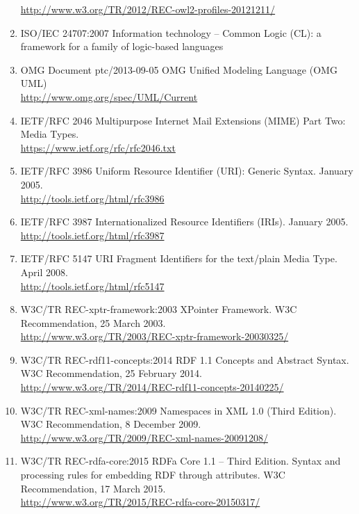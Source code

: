 \documentclass[10pt, a4paper]{isov2}
\begin{document}
\begin{enumerate}[label=\bfseries NR\arabic*]
{  \url{http://www.w3.org/TR/2012/REC-owl2-profiles-20121211/}}\label{nref-OWL2-profiles}
  \item{ISO/IEC 24707:2007} {Information technology – Common Logic (CL): a framework for a family of logic-based languages}\label{nref-CL}
  \item{OMG Document ptc/2013-09-05} {OMG Unified Modeling Language (OMG UML)\\
  \url{http://www.omg.org/spec/UML/Current}}\label{nref-UML} %
  \item{IETF/RFC 2046} {Multipurpose Internet Mail Extensions (MIME)
    Part Two: Media Types.\\ 
    \url{https://www.ietf.org/rfc/rfc2046.txt}}\label{nref-text/plain}
  \item{IETF/RFC 3986} {Uniform Resource Identifier (URI): Generic Syntax. January 2005.\\ \url{http://tools.ietf.org/html/rfc3986}}\label{nref-URI}
  \item{IETF/RFC 3987} {Internationalized Resource Identifiers (IRIs). January 2005.\\ \url{http://tools.ietf.org/html/rfc3987}}\label{nref-IRI}
  \item{IETF/RFC 5147} {URI Fragment Identifiers for the text/plain Media Type.  April 2008.\\ \url{http://tools.ietf.org/html/rfc5147}}\label{nref-text/plain-URI}
  \item{W3C/TR REC-xptr-framework:2003} {XPointer Framework.  W3C Recommendation, 25 March 2003. \\ \url{http://www.w3.org/TR/2003/REC-xptr-framework-20030325/}}\label{nref-XPointer}
  \item{W3C/TR REC-rdf11-concepts:2014} {RDF 1.1 Concepts and Abstract Syntax.  W3C Recommendation, 25 February 2014. \\ \url{http://www.w3.org/TR/2014/REC-rdf11-concepts-20140225/}}\label{nref-RDF}
  \item{W3C/TR REC-xml-names:2009} {Namespaces in XML 1.0 (Third Edition). W3C Recommendation, 8 December 2009.\\
   \url{http://www.w3.org/TR/2009/REC-xml-names-20091208/}}\label{nref-XMLns}
  \item{W3C/TR REC-rdfa-core:2015} {RDFa Core 1.1 -- Third Edition.  Syntax and processing rules for embedding RDF through attributes. W3C Recommendation, 17 March 2015.\\ \url{http://www.w3.org/TR/2015/REC-rdfa-core-20150317/}}\label{nref-RDFa}

\end{enumerate}
\end{document}
